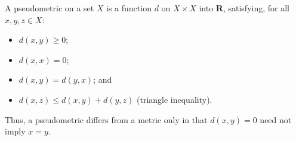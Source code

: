 A pseudometric on a set $X$ is a function $d$ on $X \times X$ into $\mathbf{R}$, satisfying, for all $x, y, z \in X$:

\begin{itemize}
\item[(i)] $d(x, y) \geq 0$;
\item[(ii)] $d(x, x) = 0$;
\item[(iii)] $d(x, y) = d(y, x)$; and
\item[(iv)] $d(x, z) \leq d(x, y) + d(y, z)$ (triangle inequality).
\end{itemize}

Thus, a pseudometric differs from a metric only in that $d(x, y) = 0$ need not imply $x = y$.
